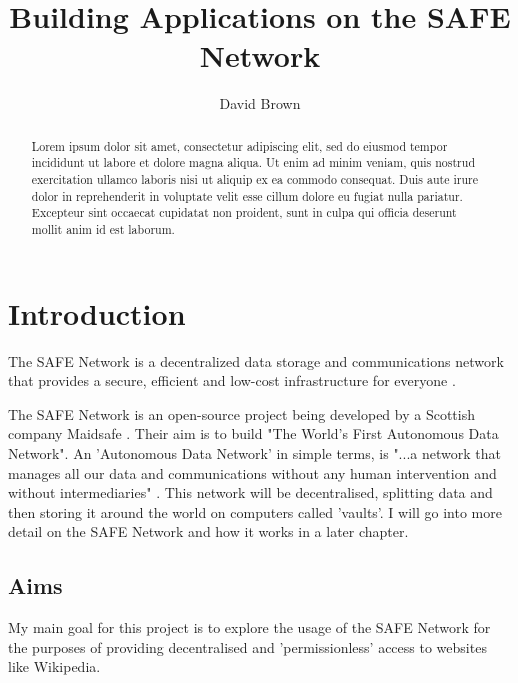 \documentclass{l4proj}
\begin{document}
\title{Building Applications on the SAFE Network}	
\author{David Brown}
\maketitle

\begin{abstract}
Lorem ipsum dolor sit amet, consectetur adipiscing elit, sed do eiusmod tempor incididunt ut labore et dolore magna aliqua. Ut enim ad minim veniam, quis nostrud exercitation ullamco laboris nisi ut aliquip ex ea commodo consequat. Duis aute irure dolor in reprehenderit in voluptate velit esse cillum dolore eu fugiat nulla pariatur. Excepteur sint occaecat cupidatat non proident, sunt in culpa qui officia deserunt mollit anim id est laborum.
\end{abstract}

\educationalconsent

\tableofcontents

\chapter{Introduction}

\begin{displayquote}
The SAFE Network is a decentralized data storage and communications network that provides a secure, efficient
and low-cost infrastructure for everyone \cite{safenetwork}.
\end{displayquote}

The SAFE Network \cite{safenetwork} is an open-source project being developed by a Scottish company Maidsafe \cite{maidsafe}. Their aim is to build "The World's First Autonomous Data Network". An 'Autonomous Data Network' in simple terms, is "...a network that manages all our data and communications without any human intervention and without intermediaries" \cite{autonomous-data-networks}. This network will be decentralised, splitting data and then storing it around the world on computers called 'vaults'. I will go into more detail on the SAFE Network and how it works in a later chapter.

\section{Aims}

My main goal for this project is to explore the usage of the SAFE Network for the purposes of providing decentralised and 'permissionless' access to websites like Wikipedia.
\end{document}
